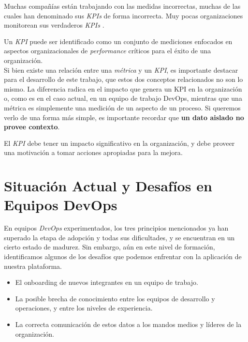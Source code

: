 \documentclass[journal]{IEEEtran}
\begin{document}
\begin{tcolorbox}[colback=gray!10, colframe=black, left=2mm, right=2mm]
    \small %
    \ttfamily %
    \raggedright %
    Muchas compañías están trabajando con las medidas incorrectas, muchas de las cuales han denominado sus \textit{KPIs} de forma incorrecta. Muy pocas organizaciones monitorean sus verdaderos \textit{KPIs} \cite{parmenter2015key}.
\end{tcolorbox}

Un \textit{KPI} puede ser identificado como un conjunto de mediciones enfocados en aspectos organizacionales de \textit{performance} críticos para el éxito de una organización\cite{heilbrunn2019gamification}.
\\Si bien existe una relación entre una \textit{métrica} y un \textit{KPI}, es importante destacar para el desarrollo de este trabajo, que estos dos conceptos relacionados no son lo mismo. La diferencia radica en el impacto que genera un KPI en la organización o, como es en el caso actual, en un equipo de trabajo DevOps, mientras que una métrica es simplemente una medición de un aspecto de un proceso. Si queremos verlo de una forma más simple, es importante recordar que \textbf{un dato aislado no provee contexto}.

El \textit{KPI} debe tener un impacto significativo en la organización, y debe proveer una motivación a tomar acciones apropiadas para la mejora\cite[Chapter 1. Key Performance Indicators]{parmenter2015key}.


\section{\textbf{\Large Situación Actual y Desafíos en Equipos DevOps}}

En equipos \textit{DevOps} experimentados, los tres principios mencionados ya han superado la etapa de adopción y todas sus dificultades, y se encuentran en un cierto estado de madurez. Sin embargo, aún en este nivel de formación, identificamos algunos de los desafíos que podemos enfrentar con la aplicación de nuestra plataforma.
\begin{itemize}
    \item El onboarding de nuevos integrantes en un equipo de trabajo.
    \item La posible brecha de conocimiento entre los equipos de desarrollo y operaciones, y entre los niveles de experiencia.
    \item La correcta comunicación de estos datos a los mandos medios y líderes de la organización.
\end{itemize}
\end{document}
